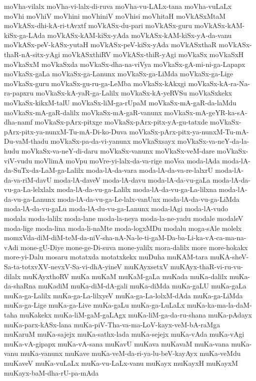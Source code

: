 {moVha-vilalx
moVha-vi-lalx-di-ruva
moVha-vu-LALx-tana
moVha-vuLaLx
moVhi
moVhiV
moVhini
moVhiniV
moVhisi
moVhitaH
moVkASxMtaM
moVkASx-dhi-kA-ri-tAvxtf
moVkASx-du-pari
moVkASx-guru
moVkASx-kAM-kiSx-ga-LAda
moVkASx-kAM-kiSx-yAda
moVkASx-kAM-kiSx-yA-da-vanu
moVkASx-peV-kASx-yutaH
moVkASx-peV-kiSx-yAda
moVkASxthaR
moVkASx-thaR-nA-sitx-yAgi
moVkASxthiRV
moVkASx-thiR-yAgi
moVkaSx
moVkaSxH
moVkaSxM
moVkaSxda
moVkaSx-dha-na-viVya
moVkaSx-gA-mi-ni-ga-Lapapx
moVkaSx-gaLa
moVkaSx-ga-Lanunx
moVkaSx-ga-LiMda
moVkaSx-ga-Lige
moVkaSx-guru
moVkaSx-gu-ru-ga-LeMba
moVkaSx-kAkxgi
moVkaSx-kA-ra-Na-ra-papxru
moVkaSx-kA-yaR-ga-Lalilx
moVkaSx-kA-yeRVSu
moVkaSxkekx
moVkaSx-kikxM-talU
moVkaSx-liM-ga-rUpaM
moVkaSx-mA-gaR-da-laMdu
moVkaSx-mA-gaR-dalilx
moVkaSx-mA-gaR-vanunx
moVkaSx-mA-geYR-ka-sA-dha-namf
moVkaSx-pArx-pitxge
moVkaSx-pArx-pitx-yA-gu-tatxde
moVkaSx-pArx-pitx-ya-nunxM-Tu-mA-Di-ko-Duva
moVkaSx-pArx-pitx-ya-nunxM-Tu-mA-Du-vaM-thadu
moVkaSx-pa-da-vi-yanunx
moVkaSxsayx
moVkaSx-va-neY-da-la-hudu
moVkaSx-va-neY-di-daru
moVkaSx-vanunx
moVkaSx-veM-dare
moVkaSx-viV-vudu
moVlimA
moVpu
moVre-yi-lalx-da-va-rige
moVsa
moda-lAda
moda-lA-da-SuTx-da-LaM-ga-Lalilx
moda-lA-da-vara
moda-lA-da-va-re-lalxrU
moda-lA-da-va-riM-davU
moda-lA-daveV
moda-lA-davu
moda-lA-da-vu-gaLa
moda-lA-da-vu-ga-La-lelxlalx
moda-lA-da-vu-ga-Lalilx
moda-lA-da-vu-ga-La-lilxna
moda-lA-da-vu-ga-Lanunx
moda-lA-da-vu-ga-Le-lalx-vanUnx
moda-lA-da-vu-ga-LiMda
moda-lA-da-vu-gaLu
moda-lA-du-vu-ga-Lanunx
moda-lAgi
moda-lA-vudo
modala
moda-lalilx
moda-lane
moda-la-neya
moda-la-ne-yadu
modale
modaleV
moda-lige
moda-lina
moda-li-naMte
moda-logxMDu
modalu
moga-sAle
molelx
momxVda-diM-diM-teM-da-niV-sha-nA-Na-le-ti-gaM-Da-ba-Li-ka-vA-ca-ma-na-vAdi
mone-gU-Diye
mone-ge-Di-suva
mone-yalilx
mora-dalilx
more
more-hokakx
more-yi-Dalu
mosaru
motatxda
motatxkekx
muDuha
muKAM-tara
muKA-sheV-Sa-ta-totxvXV-nevxV-Sa-vi-dhA-yineV
muKAyxsetxV
muKAyx-thaR-vi-ru-vu-dilalx
muKAyxthoRV
muKa
muKaM
muKaM-gaLa
muKada
muKa-dalilx
muKa-da-shaRna
muKadiM
muKa-diM-dA-gali
muKa-diMda
muKa-gaLU
muKa-gaLa
muKa-ga-Lalilx
muKa-ga-La-lilxyeV
muKa-ga-La-lolxM-dAda
muKa-ga-LiMda
muKa-ga-Lige
muKa-ga-Live
muKa-gaLu
muKa-ga-LuLaLx
muKa-ka-ma-la-daM-taha
muKakekx
muKa-liM-gaM-gaLAgx
muKa-liM-ga-da-ru-shana
muKa-pAdayx
muKa-parx-kASx-lana
muKa-piV-Tha-va-ma-LoV-kayx-veM-bA-raMga
muKaruM
muKa-sajejx
muKa-sathx-lada
muKa-sejejx
muKa-vAda
muKa-vAgi
muKa-vA-gipapx
muKa-vA-sana
muKavU
muKava
muKavaM
muKa-vana
muKa-vanu
muKa-vanunx
muKave
muKa-veM-da-ri-ya-lu-beV-kayAyx
muKa-veMdu
muKaveV
muKa-vuLaLx
muKa-vu-LaLx-vanu
muKayx
muKayxH
muKayxM
muKayx-baM-dha-rU-pa-mAda
}
